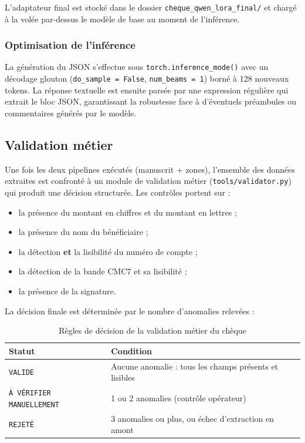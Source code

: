 L'adaptateur final est stocké dans le dossier
\texttt{cheque\_qwen\_lora\_final/} et chargé à la volée par-dessus le
modèle de base au moment de l'inférence.

\subsubsection{Optimisation de l'inférence}

La génération du JSON s'effectue sous \texttt{torch.inference\_mode()} avec
un décodage glouton (\texttt{do\_sample = False}, \texttt{num\_beams = 1})
borné à 128 nouveaux tokens. La réponse textuelle est ensuite parsée par
une expression régulière qui extrait le bloc JSON, garantissant la
robustesse face à d'éventuels préambules ou commentaires générés par le
modèle.

\subsection*{Validation métier}

Une fois les deux pipelines exécutés (manuscrit + zones), l'ensemble des
données extraites est confronté à un module de validation métier
(\texttt{tools/validator.py}) qui produit une décision structurée. Les
contrôles portent sur :
\begin{itemize}
    \item la présence du montant en chiffres et du montant en lettres ;
    \item la présence du nom du bénéficiaire ;
    \item la détection \textbf{et} la lisibilité du numéro de compte ;
    \item la détection de la bande CMC7 et sa lisibilité ;
    \item la présence de la signature.
\end{itemize}

La décision finale est déterminée par le nombre d'anomalies relevées :

\begin{table}[H]
\centering
\label{tab:validation_cheque}
\begin{tabular}{|l|l|}
\hline
\textbf{Statut} & \textbf{Condition} \\
\hline
\texttt{VALIDE}                  & Aucune anomalie : tous les champs présents et lisibles \\
\texttt{À VÉRIFIER MANUELLEMENT} & 1 ou 2 anomalies (contrôle opérateur) \\
\texttt{REJETÉ}                  & 3 anomalies ou plus, ou échec d'extraction en amont \\
\hline
\end{tabular}
\caption{Règles de décision de la validation métier du chèque}
\end{table}

